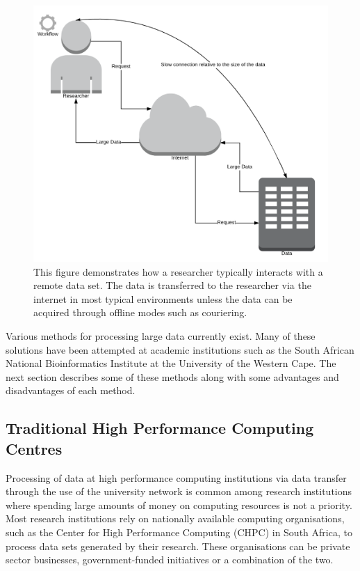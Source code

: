 \begin{figure}[ht!]
\centering
\includegraphics[width=\textwidth]{Figures/traditional_processing_model.png}
\decoRule
\caption[Traditional Researcher Data Usage Model]{This figure demonstrates how a researcher typically interacts with a remote data set. The data is transferred to the researcher via the internet in most typical environments unless the data can be acquired through offline modes such as couriering.}
\label{fig:traditional_data_model}
\end{figure}


Various methods for processing large data currently exist. Many of these solutions have been attempted at academic institutions such as the South African National Bioinformatics Institute at the University of the Western Cape. The next section describes some of these methods along with some advantages and disadvantages of each method.

\subsection{Traditional High Performance Computing Centres}

Processing of data at high performance computing institutions via data transfer through the use of the university network is common among research institutions where spending large amounts of money on computing resources is not a priority. Most research institutions rely on nationally available computing organisations, such as the Center for High Performance Computing (CHPC) in South Africa, to process data sets generated by their research. These organisations can be private sector businesses, government-funded initiatives or a combination of the two.


